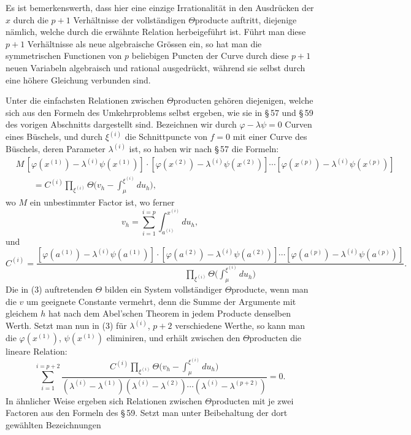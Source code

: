 \documentclass[10pt]{article}
\begin{document}
Es ist bemerkenswerth, dass hier eine einzige Irrationalität in den Ausdrücken der \(x\) durch die \(p+1\) Verhältnisse der vollständigen \(\Theta\)producte auftritt, diejenige nämlich, welche durch die erwähnte Relation herbeigeführt ist. Führt man diese \(p+1\) Verhältnisse als neue algebraische Grössen ein, so hat man die symmetrischen Functionen von \(p\) beliebigen Puncten der Curve durch diese \(p+1\) neuen Variabeln algebraisch und rational ausgedrückt, während sie selbst durch eine höhere Gleichung verbunden sind.

Unter die einfachsten Relationen zwischen \(\Theta\)producten gehören diejenigen, welche sich aus den Formeln des Umkehrproblems selbst ergeben, wie sie in \S\,57 und \S\,59 des vorigen Abschnitts dargestellt sind. Bezeichnen wir durch \(\varphi-\lambda\psi=0\) Curven eines Büschels, und durch \(\xi^{(i)}\) die Schnittpuncte von \(f=0\) mit einer Curve des Büschels, deren Parameter \(\lambda^{(i)}\) ist, so haben wir nach \S\,57 die Formeln:
\[
\tag{3}
\begin{aligned}
&M\,[\varphi(x^{(1)})-\lambda^{(i)}\psi(x^{(1)})]\cdot[\varphi(x^{(2)})-\lambda^{(i)}\psi(x^{(2)})]\cdots[\varphi(x^{(p)})-\lambda^{(i)}\psi(x^{(p)})]\\
&\qquad = C^{(i)}\prod_{\xi^{(i)}}\Theta\!\biggl(v_h-\int_{\mu}^{\xi^{(i)}}du_h\biggr),
\end{aligned}
\]
wo \(M\) ein unbestimmter Factor ist, wo ferner
\[
v_h=\sum_{i=1}^{i=p}\int_{a^{(i)}}^{x^{(i)}}du_h,
\]
und
\[
C^{(i)}=\frac{[\varphi(a^{(1)})-\lambda^{(i)}\psi(a^{(1)})]\cdot[\varphi(a^{(2)})-\lambda^{(i)}\psi(a^{(2)})]\cdots[\varphi(a^{(p)})-\lambda^{(i)}\psi(a^{(p)})]}{\displaystyle\prod_{\xi^{(i)}}\Theta\!\biggl(\int_{\mu}^{\xi^{(i)}}du_h\biggr)}.
\]
Die in (3) auftretenden \(\Theta\) bilden ein System vollständiger \(\Theta\)producte, wenn man die \(v\) um geeignete Constante vermehrt, denn die Summe der Argumente mit gleichem \(h\) hat nach dem Abel'schen Theorem in jedem Producte denselben Werth. Setzt man nun in (3) für \(\lambda^{(i)}\), \(p+2\) verschiedene Werthe, so kann man die \(\varphi(x^{(1)})\), \(\psi(x^{(1)})\) eliminiren, und erhält zwischen den \(\Theta\)producten die lineare Relation:
\[
\sum_{i=1}^{i=p+2}
\frac{C^{(i)}\prod_{\xi^{(i)}}\Theta\!\bigl(v_h-\int_{\mu}^{\xi^{(i)}}du_h\bigr)}
{(\lambda^{(i)}-\lambda^{(1)})(\lambda^{(i)}-\lambda^{(2)})\cdots(\lambda^{(i)}-\lambda^{(p+2)})}=0.
\]
In ähnlicher Weise ergeben sich Relationen zwischen \(\Theta\)producten mit je zwei Factoren aus den Formeln des \S\,59. Setzt man unter Beibehaltung der dort gewählten Bezeichnungen
\end{document}
